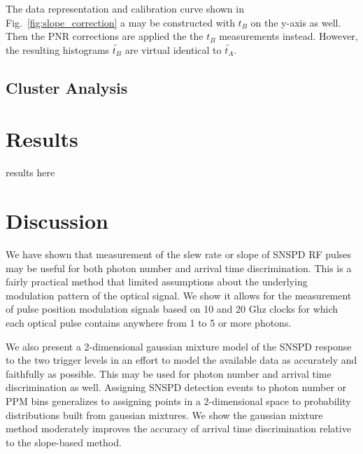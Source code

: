 \documentclass[11pt]{caltech_thesis} %
\begin{document}
The data representation and calibration curve shown in Fig.~\ref{fig:slope_correction} a may be constructed with $t_B$ on the y-axis as well. Then the PNR corrections are applied the the $t_B$ measurements instead. However, the resulting histograms $\tilde{t_B}$ are virtual identical to $\tilde{t_A}$.

\hypertarget{cluster-analysis}{%
\subsection{Cluster Analysis}\label{cluster-analysis}}

\hypertarget{results}{%
\section{Results}\label{results}}

results here

{}

\hypertarget{discussion}{%
\section{Discussion}\label{discussion}}

We have shown that measurement of the slew rate or slope of SNSPD RF pulses may be useful for both photon number and arrival time discrimination. This is a fairly practical method that limited assumptions about the underlying modulation pattern of the optical signal. We show it allows for the measurement of pulse position modulation signals based on 10 and 20 Ghz clocks for which each optical pulse contains anywhere from 1 to 5 or more photons.

We also present a 2-dimensional gaussian mixture model of the SNSPD response to the two trigger levels in an effort to model the available data as accurately and faithfully as possible. This may be used for photon number and arrival time discrimination as well. Assigning SNSPD detection events to photon number or PPM bins generalizes to assigning points in a 2-dimensional space to probability distributions built from gaussian mixtures. We show the gaussian mixture method moderately improves the accuracy of arrival time discrimination relative to the slope-based method.
\end{document}
